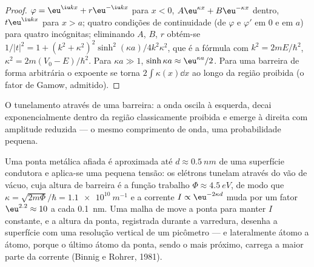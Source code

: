 \begin{proof}
$\varphi = \eu^{\iu kx} + r\eu^{-\iu kx}$ para $x < 0$, $A\eu^{\kappa x} + B\eu^{-\kappa x}$
dentro, $t\eu^{\iu kx}$ para $x > a$; quatro condições de continuidade (de $\varphi$
e $\varphi'$ em $0$ e em $a$) para quatro incógnitas; eliminando $A$, $B$, $r$
obtém-se $1/|t|^2 = 1 + (k^2 + \kappa^2)^2\sinh^2(\kappa a)/4k^2\kappa^2$, que é
a fórmula com $k^2 = 2mE/\hbar^2$, $\kappa^2 = 2m(V_0 - E)/\hbar^2$. Para
$\kappa a \gg 1$, $\sinh\kappa a \approx \eu^{\kappa a}/2$. Para uma barreira de
forma arbitrária o expoente se torna $2\int\kappa(x)\dd x$ ao longo da
região proibida (o fator de Gamow, admitido).
\end{proof}

\begin{omfigure}

{\small O tunelamento através de uma barreira: a onda oscila à esquerda,
decai exponencialmente dentro da região classicamente proibida e
emerge à direita com amplitude reduzida --- o mesmo comprimento de onda,
uma probabilidade pequena.}
\end{omfigure}

\begin{example}\label{ex:b2:potential-wells-tunneling:stm}
Uma ponta metálica afiada é aproximada até $d \approx \qty{0.5}{nm}$ de uma
superfície condutora e aplica-se uma pequena tensão: os elétrons tunelam através
do vão de vácuo, cuja altura de barreira é a função trabalho $\Phi \approx
\qty{4.5}{eV}$, de modo que $\kappa = \sqrt{2m\Phi}/\hbar = \qty{1.1e10}{m^{-1}}$ e
a corrente $I \propto \eu^{-2\kappa d}$ muda por um fator $\eu^{2.2} \approx
10$ a cada \qty{0.1}{nm}. Uma malha de  move a ponta para manter $I$
constante, e a altura da ponta, registrada durante a varredura, desenha a superfície
com uma resolução vertical de um picômetro --- e lateralmente átomo a
átomo, porque o último átomo da ponta, sendo o mais próximo, carrega a maior parte
da corrente (Binnig e Rohrer, 1981).
\end{example}

